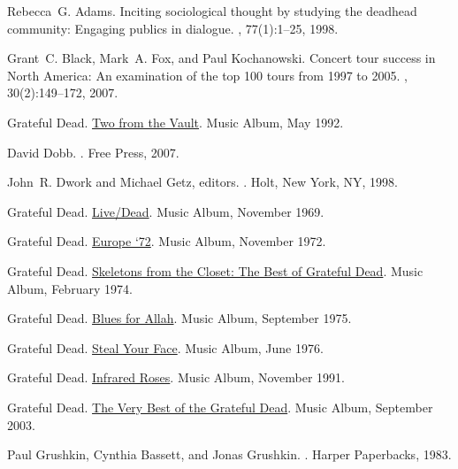 \documentclass{svmult}
\newcommand{\album}[1]{\uline{#1}}
\begin{document}
\begin{thebibliography}{10}

Rebecca~G. Adams.
\newblock Inciting sociological thought by studying the deadhead community:
  Engaging publics in dialogue.
, 77(1):1--25, 1998.

Grant~C. Black, Mark~A. Fox, and Paul Kochanowski.
\newblock Concert tour success in {North America}: An examination of the top
  100 tours from 1997 to 2005.
, 30(2):149--172, 2007.

Grateful Dead.
\newblock \album{Two from the Vault}.
\newblock Music Album, May 1992.

David Dobb.
.
\newblock Free Press, 2007.

John~R. Dwork and Michael Getz, editors.
.
\newblock Holt, New York, NY, 1998.

{Grateful Dead}.
\newblock \album{Live/Dead}.
\newblock Music Album, November 1969.

{Grateful Dead}.
\newblock \album{Europe `72}.
\newblock Music Album, November 1972.

{Grateful Dead}.
\newblock \album{Skeletons from the Closet: The Best of Grateful Dead}.
\newblock Music Album, February 1974.

{Grateful Dead}.
\newblock \album{Blues for Allah}.
\newblock Music Album, September 1975.

{Grateful Dead}.
\newblock \album{Steal Your Face}.
\newblock Music Album, June 1976.

{Grateful Dead}.
\newblock \album{Infrared Roses}.
\newblock Music Album, November 1991.

{Grateful Dead}.
\newblock \album{The Very Best of the Grateful Dead}.
\newblock Music Album, September 2003.

Paul Grushkin, Cynthia Bassett, and Jonas Grushkin.
.
\newblock Harper Paperbacks, 1983.


\end{thebibliography}
\end{document}
